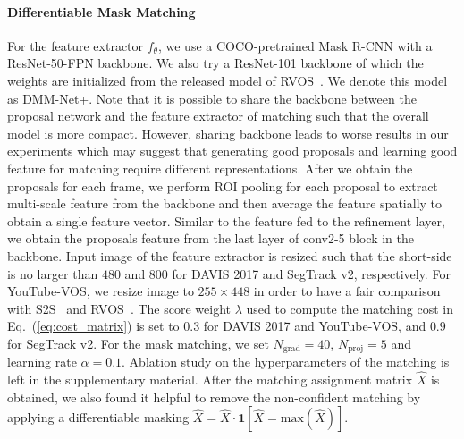 \paragraph{Differentiable Mask Matching}
For the feature extractor $f_{\theta}$, we use a COCO-pretrained Mask R-CNN with a ResNet-50-FPN backbone. 
We also try a ResNet-101 backbone of which the weights are initialized from the released model of RVOS~\cite{Ventura_2019_CVPR}.
We denote this model as DMM-Net+. 
Note that it is possible to share the backbone between the proposal network and the feature extractor of matching such that the overall model is more compact. 
However, sharing backbone leads to worse results in our experiments which may suggest that generating good proposals and learning good feature for matching require different representations.
After we obtain the proposals for each frame, we perform ROI pooling for each proposal to extract multi-scale feature from the backbone and then average the feature spatially to obtain a single feature vector. Similar to the feature fed to the refinement layer, we obtain the proposals feature from the last layer of conv2-5 block in the backbone. 
Input image of the feature extractor is resized such that the short-side is no larger than $480$ and $800$ for DAVIS 2017 and SegTrack v2, respectively. 
For YouTube-VOS, we resize image to $255\times448$ in order to have a fair comparison with S2S~\cite{Xu2018YouTubeVOSSV} and RVOS~\cite{Ventura_2019_CVPR}.
The score weight $\lambda$ used to compute the matching cost in Eq.~(\ref{eq:cost_matrix}) is set to $0.3$ for DAVIS 2017 and YouTube-VOS, and $0.9$ for SegTrack v2.
For the mask matching, we set $N_{\text{grad}} = 40$, $N_{\text{proj}} = 5$ and learning rate $\alpha=0.1$. Ablation study on the hyperparameters of the matching is left in the supplementary material. 
After the matching assignment matrix $\hat{X}$ is obtained, we also found it helpful to remove the non-confident matching by applying a differentiable masking  $\hat{X} = \hat{X} \cdot \mathbf{1} [\hat{X} = \text{max}(\hat{X})]$.

